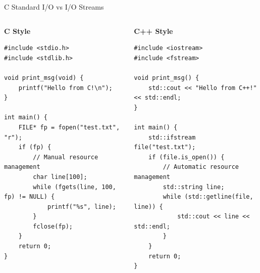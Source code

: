 \begin{frame}[fragile]{ C Standard I/O vs I/O Streams}
	\begin{columns}
		\begin{column}{0.5\textwidth}
			\textbf{C Style}
			\begin{verbatim}
#include <stdio.h>
#include <stdlib.h>

void print_msg(void) {
    printf("Hello from C!\n");
}

int main() {
    FILE* fp = fopen("test.txt", "r");
    if (fp) {
        // Manual resource management
        char line[100];
        while (fgets(line, 100, fp) != NULL) {
            printf("%s", line);
        }
        fclose(fp);
    }
    return 0;
}
			\end{verbatim}
		\end{column}
		\begin{column}{0.5\textwidth}
			\textbf{C++ Style}
			\begin{verbatim}
#include <iostream>
#include <fstream>

void print_msg() {
    std::cout << "Hello from C++!" << std::endl;
}

int main() {
    std::ifstream file("test.txt");
    if (file.is_open()) {
        // Automatic resource management
        std::string line;
        while (std::getline(file, line)) {
            std::cout << line << std::endl;
        }
    }
    return 0;
}
			\end{verbatim}
		\end{column}
	\end{columns}
\end{frame}

